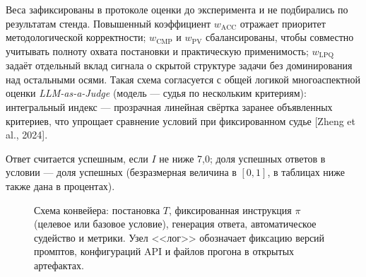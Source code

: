 \documentclass[a4paper,12pt]{article}
\begin{document}
Веса зафиксированы в протоколе оценки до эксперимента и не подбирались по результатам стенда. Повышенный коэффициент $w_{\text{ACC}}$ отражает приоритет методологической корректности; $w_{\text{CMP}}$ и $w_{\text{PV}}$ сбалансированы, чтобы совместно учитывать полноту охвата постановки и практическую применимость; $w_{\text{LPQ}}$ задаёт отдельный вклад сигнала о скрытой структуре задачи без доминирования над остальными осями. Такая схема согласуется с общей логикой многоаспектной оценки \textit{LLM-as-a-Judge} (модель --- судья по нескольким критериям): интегральный индекс --- прозрачная линейная свёртка заранее объявленных критериев, что упрощает сравнение условий при фиксированном судье [Zheng et al., 2024].

Ответ считается успешным, если $I$ не ниже 7{,}0; доля успешных ответов в условии --- доля успешных (безразмерная величина в $[0,1]$, в таблицах ниже также дана в процентах).

\begin{figure}[htbp]
  \centering
  \caption{Схема конвейера: постановка $T$, фиксированная инструкция $\pi$ (целевое или базовое условие), генерация ответа, автоматическое судейство и метрики. Узел <<лог>> обозначает фиксацию версий промптов, конфигураций API и файлов прогона в открытых артефактах.}
  \label{fig:pipeline}
\end{figure}
\end{document}
